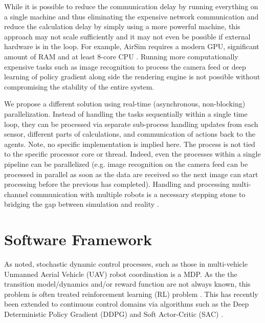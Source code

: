 \documentclass{article}
\let\cite\citep
\begin{document}
While it is possible to reduce the communication delay by running everything on a single machine and thus eliminating the expensive network communication and reduce the calculation delay by simply using a more powerful machine, this approach may not scale sufficiently and it may not even be possible if external hardware is in the loop.   For example, AirSim requires a modern GPU, significant amount of RAM and at least 8-core CPU \cite{shah2018airsim}. Running more computationally expensive tasks such as image recognition to process the camera feed or deep learning of policy gradient along side the rendering engine is not possible without compromising the stability of the entire system.

We propose a different solution using real-time (asynchronous, non-blocking) parallelization. Instead of handling the tasks sequentially within a single time loop, they can be processed via separate sub-process  %
handling updates from each sensor, different parts of calculations, and communication of actions back to the agents.
Note, no specific implementation is implied here. The process is not tied to the specific processor core or thread.
Indeed, even the processes within a single pipeline can be parallelized (e.g. image recognition on the camera feed can be processed in parallel as soon as the data are received so the next image can start processing before the previous has completed).
Handling and processing multi-channel communication with multiple robots is a necessary stepping stone to bridging the gap between simulation and reality \cite{loquercio2019deep, james2019sim}. %



\section{Software Framework}

As noted, stochastic dynamic control processes, such as those in multi-vehicle Unmanned Aerial Vehicle (UAV) robot coordination is a MDP.   As the the transition model/dynamics and/or reward function are not always known, this problem is often treated reinforcement learning (RL) problem \cite{sutton2018reinforcement}.  This has recently been extended to continuous control domains  \cite{henderson2018deep} via algorithms such as the Deep Deterministic Policy Gradient (DDPG) \cite{DDPG} and Soft Actor-Critic (SAC) \cite{SAC}.
\end{document}
